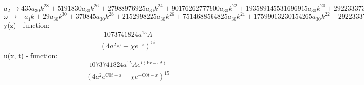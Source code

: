 \documentclass[12pt,a4paper,draft]{article}
\begin{document}
$a_{2}\to 435 a_{30} k^{28}+5191830 a_{30} k^{26}+27988976925 a_{30} k^{24}+90176262777900 a_{30} k^{22}+193589145531696915 a_{30} k^{20}+292233373258274516250 a_{30} k^{18}+318947670524581324429365 a_{30} k^{16}+254718391158384471279081000 a_{30} k^{14}+148834154959808045778734585265 a_{30} k^{12}+62875080173592402053972484729450 a_{30} k^{10}+18702592274070196236306542304243855 a_{30} k^8+3730399805850411429395847108855280620 a_{30} k^6+455157903961839394042172138614307417865 a_{30} k^4+27783970154904499878214476869746452502950 a_{30} k^2+422939763786947441219143966710178037769375 a_{30}$\\
$\omega \to -a_{1} k+29 a_{30} k^{30}+370845 a_{30} k^{28}+2152998225 a_{30} k^{26}+7514688564825 a_{30} k^{24}+17599013230154265 a_{30} k^{22}+29223337325827451625 a_{30} k^{20}+35438630058286813825485 a_{30} k^{18}+31839798894798058909885125 a_{30} k^{16}+21262022137115435111247797895 a_{30} k^{14}+10479180028932067008995414121575 a_{30} k^{12}+3740518454814039247261308460848771 a_{30} k^{10}+932599951462602857348961777213820155 a_{30} k^8+151719301320613131347390712871435805955 a_{30} k^6+13891985077452249939107238434873226251475 a_{30} k^4+422939763786947441219143966710178037769375 a_{30} k^2-17410450495992757948660282634885774797265625 a_{30}$\\


y(z) - function:
$$
\frac{1073741824 a^{15} A}{\left(4 a^2 e^z+\chi  e^{-z}\right)^{15}}
$$
u(x, t) - function:
$$
\frac{1073741824 a^{15} A e^{i (k x-\omega  t)}}{\left(4 a^2 e^{\text{C0} t+x}+\chi  e^{-\text{C0} t-x}\right)^{15}}
$$
\end{document}
